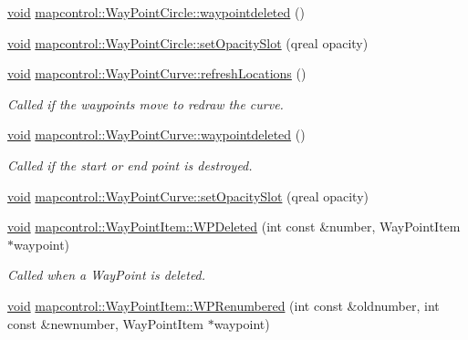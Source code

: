 \begin{DoxyCompactItemize}
\item 
\hyperlink{group___u_a_v_objects_plugin_ga444cf2ff3f0ecbe028adce838d373f5c}{void} \hyperlink{group___o_p_map_widget_ga25a712ca0ed34f0163763e1244f9cee8}{mapcontrol\-::\-Way\-Point\-Circle\-::waypointdeleted} ()
\item 
\hyperlink{group___u_a_v_objects_plugin_ga444cf2ff3f0ecbe028adce838d373f5c}{void} \hyperlink{group___o_p_map_widget_ga4dcdc126c105f68278a330efd6e8e590}{mapcontrol\-::\-Way\-Point\-Circle\-::set\-Opacity\-Slot} (qreal opacity)
\item 
\hyperlink{group___u_a_v_objects_plugin_ga444cf2ff3f0ecbe028adce838d373f5c}{void} \hyperlink{group___o_p_map_widget_ga5ce80f636cc1414d154b751de3a0f6f3}{mapcontrol\-::\-Way\-Point\-Curve\-::refresh\-Locations} ()
\begin{DoxyCompactList}\small\item\em \-Called if the waypoints move to redraw the curve. \end{DoxyCompactList}\item 
\hyperlink{group___u_a_v_objects_plugin_ga444cf2ff3f0ecbe028adce838d373f5c}{void} \hyperlink{group___o_p_map_widget_gad0bb9ce622beb314a984fa559fb1d894}{mapcontrol\-::\-Way\-Point\-Curve\-::waypointdeleted} ()
\begin{DoxyCompactList}\small\item\em \-Called if the start or end point is destroyed. \end{DoxyCompactList}\item 
\hyperlink{group___u_a_v_objects_plugin_ga444cf2ff3f0ecbe028adce838d373f5c}{void} \hyperlink{group___o_p_map_widget_ga61d082b265428ef62b08b8faf2fa8ec0}{mapcontrol\-::\-Way\-Point\-Curve\-::set\-Opacity\-Slot} (qreal opacity)
\item 
\hyperlink{group___u_a_v_objects_plugin_ga444cf2ff3f0ecbe028adce838d373f5c}{void} \hyperlink{group___o_p_map_widget_ga4f73652bac019e1b92fc67c4a2403b2b}{mapcontrol\-::\-Way\-Point\-Item\-::\-W\-P\-Deleted} (int const \&number, \-Way\-Point\-Item $\ast$waypoint)
\begin{DoxyCompactList}\small\item\em \-Called when a \-Way\-Point is deleted. \end{DoxyCompactList}\item 
\hyperlink{group___u_a_v_objects_plugin_ga444cf2ff3f0ecbe028adce838d373f5c}{void} \hyperlink{group___o_p_map_widget_ga071a506384379c4aabb30ea5dc0fa4e1}{mapcontrol\-::\-Way\-Point\-Item\-::\-W\-P\-Renumbered} (int const \&oldnumber, int const \&newnumber, \-Way\-Point\-Item $\ast$waypoint)

\end{DoxyCompactItemize}
